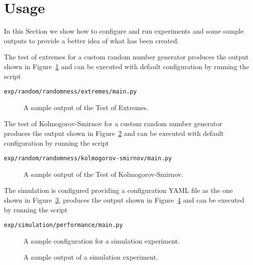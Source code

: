 \section{Usage}
\label{sec:usage}


In this Section we show how to configure and run experiments and some sample outputs to provide a better idea of what has been created.

The test of extremes for a custom random number generator produces the output shown in Figure~\ref{fig:usage-randomness-extremes} and can be executed with default configuration by running the script

\begin{lstlisting}
exp/random/randomness/extremes/main.py
\end{lstlisting}

\begin{figure}
	\centering
	
	\caption{A sample output of the Test of Extremes.}
	\label{fig:usage-randomness-extremes}
\end{figure}

The test of Kolmogorov-Smirnov for a custom random number generator produces the output shown in Figure~\ref{fig:usage-randomness-kolmogorov-smirnov} and can be executed with default configuration by running the script

\begin{lstlisting}
exp/random/randomness/kolmogorov-smirnov/main.py
\end{lstlisting}

\begin{figure}
	\centering
	
	\caption{A sample output of the Test of Kolmogorov-Smirnov.}
	\label{fig:usage-randomness-kolmogorov-smirnov}
\end{figure}

The simulation is configured providing a configuration YAML file as the one shown in Figure~\ref{fig:usage-simulation-configuration}, produces the output shown in Figure~\ref{fig:usage-simulation-output} and can be executed by running the script

\begin{lstlisting}
exp/simulation/performance/main.py
\end{lstlisting}

\begin{figure}
	\centering
	
	\caption{A sample configuration for a simulation experiment.}
	\label{fig:usage-simulation-configuration}
\end{figure}

\begin{figure}
	\centering
	
	\caption{A sample output of a simulation experiment.}
	\label{fig:usage-simulation-output}
\end{figure}


